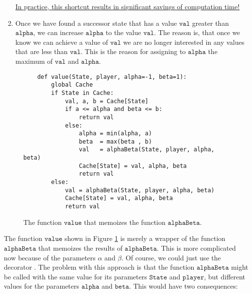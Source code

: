 \begin{enumerate}
      \underline{In }p\underline{ractice},\underline{ this shortcut results in si}g\underline{nificant savin}g\underline{s of com}p\underline{utation time!}
\item Once we have found a successor state that has a value $\texttt{val}$ greater than $\texttt{alpha}$,
      we can increase $\texttt{alpha}$ to the value $\texttt{val}$.  The reason is, that once we know we can
      achieve a value of $\texttt{val}$ we are no longer interested in any values that are less than $\texttt{val}$.
      This is the reason for assigning to $\texttt{alpha}$ the maximum of $\texttt{val}$ and $\texttt{alpha}$.
\end{enumerate}

\begin{figure}[!ht]
\centering
\begin{verbatim}
    def value(State, player, alpha=-1, beta=1):
        global Cache
        if State in Cache:
            val, a, b = Cache[State]
            if a <= alpha and beta <= b:
                return val
            else:
                alpha = min(alpha, a)
                beta  = max(beta , b)
                val   = alphaBeta(State, player, alpha, beta)
                Cache[State] = val, alpha, beta
                return val
        else:
            val = alphaBeta(State, player, alpha, beta)
            Cache[State] = val, alpha, beta
            return val                
\end{verbatim}
\vspace*{-1.0cm}
\caption{The function $\mathtt{value}$ that memoizes the function $\mathtt{alphaBeta}$.}
\label{fig:Alpha-Beta-Pruning.ipynb:value}
\end{figure}
The function $\texttt{value}$ shown in Figure \ref{fig:Alpha-Beta-Pruning.ipynb:value} is merely a wrapper of
the function $\mathtt{alphaBeta}$ that memoizes the results of $\mathtt{alphaBeta}$.  This is more complicated
now because of the parameters $\alpha$ and $\beta$.  Of course, we could just use the decorator
\texttt{\@memoize}.  The problem with this approach is that the function $\mathtt{alphaBeta}$ might be called
with the same value for its parameters $\mathtt{State}$ and $\mathtt{player}$, but different values for the
parameters $\mathtt{alpha}$ and $\mathtt{beta}$.  This would have two consequences:
